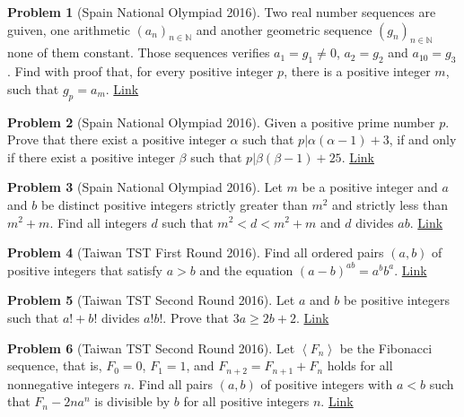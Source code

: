 \documentclass[]{article}
\theoremstyle{definition}
\newtheorem{problem}{Problem}
\begin{document}
\begin{problem}[Spain National Olympiad 2016]
	Two real number sequences are guiven, one arithmetic $\left(a_n\right)_{n\in \mathbb {N}}$ and another geometric sequence $\left(g_n\right)_{n\in \mathbb {N}}$ none of them constant. Those sequences verifies $a_1=g_1\neq 0$, $a_2=g_2$ and $a_{10}=g_3$. Find with proof that, for every positive integer $p$, there is a positive integer $m$, such that $g_p=a_m$. \hfill \href{http://artofproblemsolving.com/community/c6h1221152p6106939}{Link}
\end{problem}



\begin{problem}[Spain National Olympiad 2016]
	Given a positive prime number $p$. Prove that there exist a positive integer $\alpha$ such that $p|\alpha(\alpha-1)+3$, if and only if there exist a positive integer $\beta$ such that $p|\beta(\beta-1)+25$. \hfill \href{http://artofproblemsolving.com/community/c6h1221267p6107917}{Link}
\end{problem}



\begin{problem}[Spain National Olympiad 2016]
	Let $m$ be a positive integer and $a$ and $b$ be distinct positive integers strictly greater than $m^2$ and strictly less than $m^2+m$. Find all integers $d$ such that $m^2 < d < m^2+m$ and $d$ divides $ab$. \hfill \href{http://artofproblemsolving.com/community/c6h1290418p6823262}{Link}
\end{problem}



\begin{problem}[Taiwan TST First Round 2016]
	Find all ordered pairs $(a,b)$ of positive integers that satisfy $a>b$ and the equation $(a-b)^{ab}=a^bb^a$. \hfill \href{http://artofproblemsolving.com/community/c6h1269733p6630169}{Link}
\end{problem}



\begin{problem}[Taiwan TST Second Round 2016]
	Let $a$ and $b$ be positive integers such that $a! + b!$ divides $a!b!$. Prove that $3a \ge 2b + 2$. \hfill \href{http://artofproblemsolving.com/community/c6h1268852p6622214}{Link}
\end{problem}



\begin{problem}[Taiwan TST Second Round 2016]
	Let $\left< F_n\right>$ be the Fibonacci sequence, that is, $F_0=0$, $F_1=1$, and $F_{n+2}=F_{n+1}+F_{n}$ holds for all nonnegative integers $n$.
	Find all pairs $(a,b)$ of positive integers with $a < b$ such that $F_n-2na^n$ is divisible by $b$ for all positive integers $n$. \hfill \href{http://artofproblemsolving.com/community/c6h1274121p6672411}{Link}
\end{problem}
\end{document}

